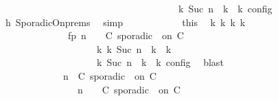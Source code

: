 \begin{isabellebody}
\ \ \ \ \ \ \ \ \ \ \ \ \ \ \ \ \ \ \ \ \ \ \ \ \ \ \ \ \ \ \ \ \ {\isasymand}\ {\isacharparenleft}{\isasymrho}\ {\isasymin}\ {\isasymlbrakk}\ {\isasymGamma}\isactrlsub k{\isacharcomma}\ Suc\ n\ {\isasymturnstile}\ {\isasymPsi}\isactrlsub k\ {\isasymtriangleright}\ {\isasymPhi}\isactrlsub k\ {\isasymrbrakk}\isactrlsub c\isactrlsub o\isactrlsub n\isactrlsub f\isactrlsub i\isactrlsub g{\isacharparenright}{\isacartoucheclose}\isanewline
\ \ \ \ \ \ \ \ \ \ \ \ \isamarkupfalse%
\ h{}\ SporadicOn{\isachardot}prems\ \isamarkupfalse%
\ simp\isanewline
\ \ \ \ \ \ \ \ \ \ \isamarkupfalse%
\ this\ \isamarkupfalse%
\ {\isasymGamma}\isactrlsub k\ {\isasymPsi}\isactrlsub k\ {\isasymPhi}\isactrlsub k\ k\ \isanewline
\ \ \ \ \ \ \ \ \ \ \ \ \ \ fp{\isacharcolon}{\isacartoucheopen}{\isacharparenleft}{\isacharparenleft}{\isasymGamma}{\isacharcomma}\ n\ {\isasymturnstile}\ {\isasymPsi}\ {\isasymtriangleright}\ {\isacharparenleft}{\isacharparenleft}C\ sporadic\ {\isasymtau}\ on\ C\ {\isacharhash}\ {\isasymPhi}{\isacharparenright}{\isacharparenright}\isanewline
\ \ \ \ \ \ \ \ \ \ \ \ \ \ \ \ \ \ \ \ {\isasymhookrightarrow}\isactrlbsup k\isactrlesup \ {\isacharparenleft}{\isasymGamma}\isactrlsub k{\isacharcomma}\ Suc\ n\ {\isasymturnstile}\ {\isasymPsi}\isactrlsub k\ {\isasymtriangleright}\ {\isasymPhi}\isactrlsub k{\isacharparenright}{\isacharparenright}\isanewline
\ \ \ \ \ \ \ \ \ \ \ \ \ \ \ \ {\isasymand}\ {\isasymrho}\ {\isasymin}\ {\isasymlbrakk}\ {\isasymGamma}\isactrlsub k{\isacharcomma}\ Suc\ n\ {\isasymturnstile}\ {\isasymPsi}\isactrlsub k\ {\isasymtriangleright}\ {\isasymPhi}\isactrlsub k\ {\isasymrbrakk}\isactrlsub c\isactrlsub o\isactrlsub n\isactrlsub f\isactrlsub i\isactrlsub g{\isacartoucheclose}\ \isamarkupfalse%
\ blast\isanewline
\ \ \ \ \ \ \ \ \ \ \isamarkupfalse%
\isanewline
\ \ \ \ \ \ \ \ \ \ \ \ {\isacartoucheopen}{\isacharparenleft}{\isasymGamma}{\isacharcomma}\ n\ {\isasymturnstile}\ {\isacharparenleft}{\isacharparenleft}C\ sporadic\ {\isasymtau}\ on\ C\ {\isacharhash}\ {\isasymPsi}{\isacharparenright}\ {\isasymtriangleright}\ {\isasymPhi}{\isacharparenright}\isanewline
\ \ \ \ \ \ \ \ \ \ \ \ \ \ {\isasymhookrightarrow}\ {\isacharparenleft}{\isasymGamma}{\isacharcomma}\ n\ {\isasymturnstile}\ {\isasymPsi}\ {\isasymtriangleright}\ {\isacharparenleft}{\isacharparenleft}C\ sporadic\ {\isasymtau}\ on\ C\ {\isacharhash}\ {\isasymPhi}{\isacharparenright}{\isacharparenright}{\isacartoucheclose}\isanewline

\end{isabellebody}
